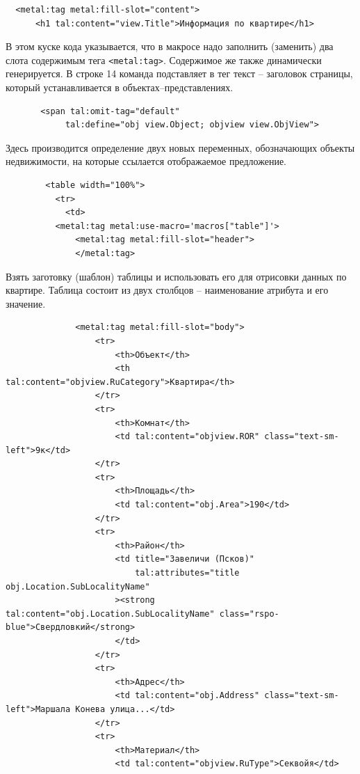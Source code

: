 \documentclass[a4paper,14pt,openany,final]{extreport} %
\begin{document}
{\begin{verbatim}
  <metal:tag metal:fill-slot="content">
      <h1 tal:content="view.Title">Информация по квартире</h1>
\end{verbatim}
В этом куске кода указывается, что в макросе надо заполнить (заменить) два слота содержимым тега \verb|<metal:tag>|. Содержимое же также динамически генерируется. В строке 14 команда подставляет в тег текст -- заголовок страницы, который устанавливается в объектах--представлениях.
\begin{verbatim}
       <span tal:omit-tag="default"
            tal:define="obj view.Object; objview view.ObjView">
\end{verbatim}
Здесь производится определение двух новых переменных, обозначающих объекты недвижимости, на которые ссылается отображаемое предложение.
\begin{verbatim}
        <table width="100%">
          <tr>
            <td>
          <metal:tag metal:use-macro='macros["table"]'>
              <metal:tag metal:fill-slot="header">
              </metal:tag>
\end{verbatim}
Взять заготовку (шаблон) таблицы и использовать его для отрисовки данных по квартире. Таблица состоит из двух столбцов -- наименование атрибута и его значение.
\begin{verbatim}
              <metal:tag metal:fill-slot="body">
                  <tr>
                      <th>Объект</th>
                      <th tal:content="objview.RuCategory">Квартира</th>
                  </tr>
                  <tr>
                      <th>Комнат</th>
                      <td tal:content="objview.ROR" class="text-sm-left">9к</td>
                  </tr>
                  <tr>
                      <th>Площадь</th>
                      <td tal:content="obj.Area">190</td>
                  </tr>
                  <tr>
                      <th>Район</th>
                      <td title="Завеличи (Псков)"
                          tal:attributes="title obj.Location.SubLocalityName"
                      ><strong tal:content="obj.Location.SubLocalityName" class="rspo-blue">Свердловкий</strong>
                      </td>
                  </tr>
                  <tr>
                      <th>Адрес</th>
                      <td tal:content="obj.Address" class="text-sm-left">Маршала Конева улица...</td>
                  </tr>
                  <tr>
                      <th>Материал</th>
                      <td tal:content="objview.RuType">Секвойя</td>

\end{verbatim}}
\end{document}
